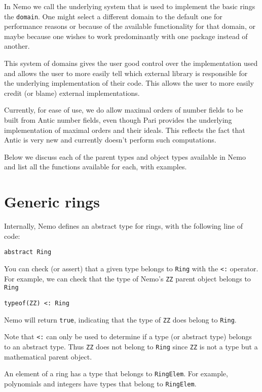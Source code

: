 \documentclass[a4paper,10pt]{article}
\newcommand{\code}{\lstinline}
\begin{document}
In Nemo we call the underlying system that is used to implement the basic rings the \code{domain}. One
might select a different domain to the default one for performance reasons or because of the available
functionality for that domain, or maybe because one wishes to work predominantly with one package
instead of another. 

This system of domains gives the user good control over the implementation used and allows the user to
more easily tell which external library is responsible for the underlying implementation of their code.
This allows the user to more easily credit (or blame) external implementations.

Currently, for ease of use, we do allow maximal orders of number fields to be built from Antic number
fields, even though Pari provides the underlying implementation of maximal orders and their ideals. This
reflects the fact that Antic is very new and currently doesn't perform such computations.

Below we discuss each of the parent types and object types available in Nemo and list all the functions
available for each, with examples.

\section{Generic rings}

Internally, Nemo defines an abstract type for rings, with the following line of code:

\begin{lstlisting}
abstract Ring
\end{lstlisting}

You can check (or assert) that a given type belongs to \code{Ring} with the
\code{<:} operator. For example, we can check that the type of Nemo's \code{ZZ} parent object belongs
to \code{Ring}

\begin{lstlisting}
typeof(ZZ) <: Ring
\end{lstlisting}

Nemo will return \code{true}, indicating that the type of \code{ZZ} does belong to \code{Ring}.

Note that \code{<:} can only be used to determine if a type (or abstract type) belongs to an abstract
type. Thus \code{ZZ} does not belong to \code{Ring} since \code{ZZ} is not a type but a mathematical
parent object.

An element of a ring has a type that belongs to \code{RingElem}. For example, polynomials and integers
have types that belong to \code{RingElem}.
\end{document}
